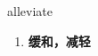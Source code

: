 
\begin{frame}
{\huge alleviate}
\begin{center}
\begin{enumerate}\Large
  \item \textbf{缓和，减轻}
\end{enumerate}
\end{center}
\end{frame}
